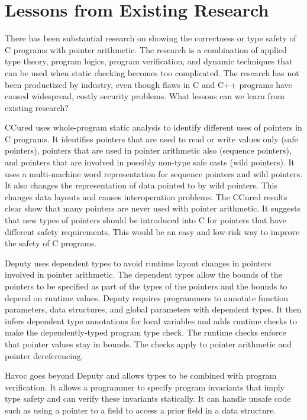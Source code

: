 
\chapter{Lessons from Existing Research}
\label{chapter:lessons}

There has been substantial research on showing the correctness or type
safety of C programs with pointer arithmetic. The research is a
combination of applied type theory, program logics, program
verification, and dynamic techniques that can be used when static
checking becomes too complicated. The research has not been productized
by industry, even though flaws in C and C++ programs have caused
widespread, costly security problems.  What
lessons can we learn from existing research?

CCured \cite{Necula2005} uses whole-program static analysis to identify 
different uses of pointers in C programs. It identifies pointers that are used to
read or write values only (safe pointers), pointers that are used in pointer
arithmetic also (sequence pointers), and pointers that are involved in
possibly non-type safe casts (wild pointers). It uses a multi-machine
word representation for sequence pointers and wild pointers. It also
changes the representation of data pointed to by wild pointers. This
changes data layouts and causes interoperation problems. The CCured
results clear show that many pointers are never used with pointer
arithmetic. It suggests that new types of pointers should be introduced
into C for pointers that have different safety requirements. This would
be an easy and low-risk way to improve the safety of C programs.

Deputy \cite{Condit2007,Feng2006} uses dependent types to avoid runtime layout changes
in pointers involved in pointer arithmetic. The dependent types allow the bounds of
the pointers to be specified as part of the types of the pointers and
the bounds to depend on runtime values. Deputy requires programmers to
annotate function parameters, data structures, and global parameters
with dependent types. It then infers dependent type annotations for
local variables and adds runtime checks to make the dependently-typed
program type check. The runtime checks enforce that pointer values stay
in bounds. The checks apply to pointer arithmetic and pointer
dereferencing.

Havoc \cite{Condit2009} goes beyond Deputy and allows types to be combined with program
verification. It allows a programmer to specify program invariants that
imply type safety and can verify these invariants statically. It can
handle unsafe code such as using a pointer to a field to access a prior
field in a data structure.


